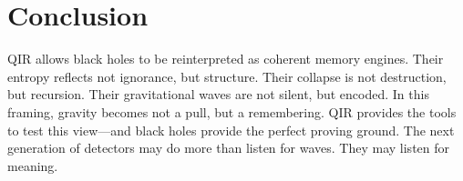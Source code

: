 \documentclass[11pt]{article}
\begin{document}
\section{Conclusion}

QIR allows black holes to be reinterpreted as coherent memory engines. Their entropy reflects not ignorance, but structure. Their collapse is not destruction, but recursion. Their gravitational waves are not silent, but encoded. In this framing, gravity becomes not a pull, but a remembering. QIR provides the tools to test this view—and black holes provide the perfect proving ground. The next generation of detectors may do more than listen for waves. They may listen for meaning.
\end{document}
